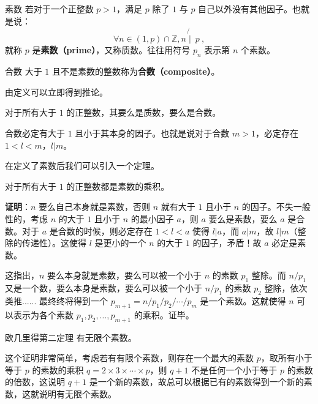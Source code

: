 
\begin{definition}{素数}
若对于一个正整数 $p > 1$，满足 $p$ 除了 $1$ 与 $p$ 自己以外没有其他因子。也就是说：
\begin{equation}
\forall n \in (1,p) \cap \mathbb Z, n \not{\mid} ~ p ~,
\end{equation}
就称 $p$ 是\textbf{素数（prime）}，又称质数。往往用符号 $p_n$ 表示第 $n$ 个素数。
\end{definition}

\begin{definition}{合数}
大于 $1$ 且不是素数的整数称为\textbf{合数（composite）}。
\end{definition}

由定义可以立即得到推论。
\begin{corollary}{}
对于所有大于 $1$ 的正整数，其要么是质数，要么是合数。
\end{corollary}
\begin{corollary}{}
合数必定有大于 $1$ 且小于其本身的因子。也就是说对于合数 $m > 1$，必定存在 $1 < l < m$，$l | m$。
\end{corollary}



在定义了素数后我们可以引入一个定理。
\begin{theorem}{}\label{the_prmnt_1}
对于所有大于 $1$ 的正整数都是素数的乘积。
\end{theorem}
\textbf{证明}：$n$ 要么自己本身就是素数，否则 $n$ 就有大于 $1$ 且小于 $n$ 的因子。不失一般性的，考虑 $n$ 的大于 $1$ 且小于 $n$ 的最小因子 $a$，则 $a$ 要么是素数，要么 $a$ 是合数。对于 $a$ 是合数的时候，则必定存在 $1 < l < a$ 使得 $l | a$，而 $a | m$，故 $l|m$（整除的传递性）。这使得 $l$ 是更小的一个 $n$ 的大于 $1$ 的因子，矛盾！故 $a$ 必定是素数。

这指出，$n$ 要么本身就是素数，要么可以被一个小于 $n$ 的素数 $p_1$ 整除。而 $n / p_1$ 又是一个数，要么本身是素数，要么可以被一个小于 $n / p_1$ 的素数 $p_2$ 整除，依次类推...... 最终终将得到一个 $p_{m+1} = n/ p_1 / p_2 / \cdots / p_m$ 是一个素数。这就使得 $n$ 可以表示为各个素数 $p_1, p_2, \dots, p_{m+1}$ 的乘积。证毕。

\begin{theorem}{欧几里得第二定理}
有无限个素数。
\end{theorem}
这个证明非常简单，考虑若有有限个素数，则存在一个最大的素数 $p$，取所有小于等于 $p$ 的素数的乘积 $q = 2 \times 3 \times \cdots \times p$，则 $q+1$ 不是任何一个小于等于 $p$ 的素数的倍数，这说明 $q+1$ 是一个新的素数，故总可以根据已有的素数得到一个新的素数，这就说明有无限个素数。

